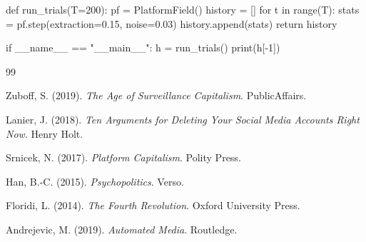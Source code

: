\documentclass[11pt,a4paper]{article}
\theoremstyle{plain}
\theoremstyle{definition}
\theoremstyle{remark}
\begin{document}
def run_trials(T=200):
    pf = PlatformField()
    history = []
    for t in range(T):
        stats = pf.step(extraction=0.15, noise=0.03)
        history.append(stats)
    return history

if __name__ == "__main__":
    h = run_trials()
    print(h[-1])


\begin{thebibliography}{99}

Zuboff, S. (2019). \emph{The Age of Surveillance Capitalism}. PublicAffairs.

Lanier, J. (2018). \emph{Ten Arguments for Deleting Your Social Media Accounts Right Now}. Henry Holt.

Srnicek, N. (2017). \emph{Platform Capitalism}. Polity Press.

Han, B.-C. (2015). \emph{Psychopolitics}. Verso.

Floridi, L. (2014). \emph{The Fourth Revolution}. Oxford University Press.

Andrejevic, M. (2019). \emph{Automated Media}. Routledge.

\end{thebibliography}
\end{document}
